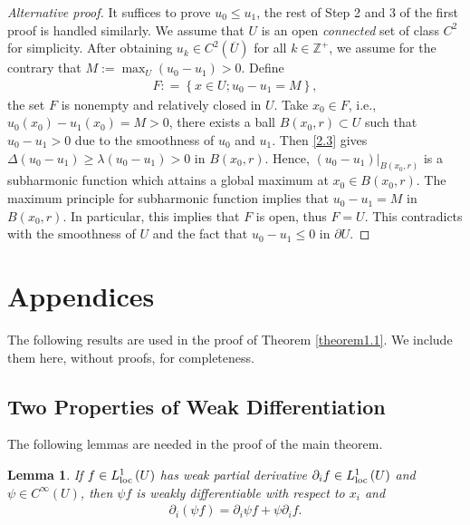 \documentclass[11pt,a4paper,center,notitlepage]{article}
\numberwithin{equation}{section}
\newtheorem{lemma}{Lemma}[section]
\begin{document}
\begin{proof}[Alternative proof] 
It suffices to prove $u_0\le u_1$, the rest of Step 2 and 3 of the first proof is handled similarly. We assume that $U$ is an open \textit{connected} set of class $C^2$ for simplicity. After obtaining $u_k \in C^2\left(\overline{U}\right)$ for all $k\in \mathbb{Z}^+$, we assume for the contrary that $M:={\max _U}\left( {{u_0} - {u_1}} \right) > 0$. Define 
\begin{align}
F: = \left\{ {x \in U;{u_0} - {u_1} = M} \right\} ,
\end{align}
the set $F$ is nonempty and relatively closed in $U$. Take $x_0 \in F$, i.e., $u_0\left(x_0\right)-u_1\left(x_0\right) =M >0$, there exists a ball $B\left(x_0,r\right) \subset U$ such that $u_0-u_1>0$ due to the smoothness of $u_0$ and $u_1$. Then \eqref{2.3} gives $\Delta \left( {{u_0} - {u_1}} \right) \ge \lambda \left( {{u_0} - {u_1}} \right) > 0$ in $B\left(x_0,r\right)$. Hence, ${\left. {\left({u_0} - {u_1}\right)} \right|_{B\left( {{x_0},r} \right)}}$ is a subharmonic function which attains a global maximum at $x_0 \in B\left(x_0,r\right)$. The maximum principle for subharmonic function implies that $u_0 -u_1 =M$ in $B\left(x_0,r\right)$. In particular, this implies that $F$ is open, thus $F =U$. This contradicts with  the smoothness of $U$ and the fact that $u_0-u_1\le 0$ in $\partial U$.
\end{proof}

\section{Appendices}
The following results are used in the proof of Theorem \ref{theorem1.1}. We include them here, without proofs, for completeness.

\subsection{Two Properties of Weak Differentiation}
The following lemmas are needed in the proof of the main theorem.
\begin{lemma}\label{lemma1.1}
If $f\in L_{\rm loc}^1 \left(U\right)$ has weak partial derivative $\partial _i f\in L_{\rm loc}^1 \left(U\right)$ and $\psi \in C^\infty \left(U\right)$, then $\psi f$ is weakly differentiable with respect to $x_i$ and 
\begin{align}
\label{2.1}
{\partial _i}\left( {\psi f} \right) = {\partial _i}\psi f + \psi {\partial _i}f.
\end{align}
\end{lemma}
\end{document}
